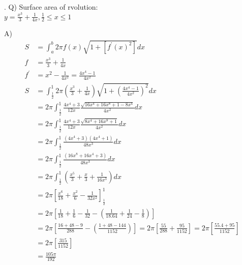 \documentclass{article}
\newcounter{question}
\begin{document}
\newcommand\Que[1]{%
   \leavevmode\par
   \stepcounter{question}
   \noindent
   \thequestion. Q) #1\par}

\newcommand\Ans[2][]{%
    \leavevmode\par\noindent
   {A) \textbf{#1}#2\par}}

\Que{
    Surface area of rvolution:\\

    $ y = \frac{x^3}{3}+\frac{1}{4x}, \frac{1}{2} \le x \le 1 $\\
    }
\Ans{
    \begin{align*}
        S & = \int_a^b{2\pi f(x) \sqrt{1+[f^{\prime}(x)^2]}} dx\\
        f & = \frac{x^3}{3}+\frac{1}{4x}\\
        f^{\prime} & = x^2-\frac{1}{4x^2}
        = \frac{4x^4-1}{4x^2}\\
        S & = \int_{\frac{1}{2}}^1{2\pi 
            (\frac{x^3}{3}+\frac{1}{4x})
            \sqrt{1+(\frac{4x^4-1}{4x^2})^2}} dx\\
        & = 2\pi \int_{\frac{1}{2}}^1{
            \frac{4x^4+3}{12x}
            \frac{\sqrt{16x^4+16x^8+1-8x^4}}{4x^2}
            } dx\\
        & = 2\pi \int_{\frac{1}{2}}^1{
            \frac{4x^4+3}{12x}
            \frac{\sqrt{8x^4+16x^8+1}}{4x^2}
            } dx\\
        & = 2\pi \int_{\frac{1}{2}}^1{
            \frac{(4x^4+3)(4x^4+1)}{48x^3}
            } dx\\
        & = 2\pi \int_{\frac{1}{2}}^1{
            \frac{(16x^8+16x^4+3)}{48x^3}
            } dx\\
        & = 2\pi \int_{\frac{1}{2}}^1{
            (\frac{x^5}{3}
            +\frac{x}{3}
            +\frac{1}{16x^3})
            } dx\\
        & = 2\pi \left[
            \frac{x^6}{18}
            +\frac{x^2}{6}
            -\frac{1}{32x^2}
            \right]_{\frac{1}{2}}^1\\
        & = 2\pi \left[
            \frac{1}{18}
            +\frac{1}{6}
            -\frac{1}{32}
            - (\frac{1}{18.64}
            +\frac{1}{24}
            -\frac{1}{8})
            \right]\\
        & = 2\pi \left[
            \frac{16+48-9}{288}
            -
            (\frac{1+48-144}{1152})
            \right]
        = 2\pi \left[
            \frac{55}{288}
            +
            \frac{95}{1152}
            \right]
        = 2\pi \left[
            \frac{55.4 + 95}{1152}
            \right]\\
        & = 2\pi \left[
            \frac{315}{1152}
            \right]\\
        & = \frac{105\pi}{192}
    \end{align*}
}
\end{document}
